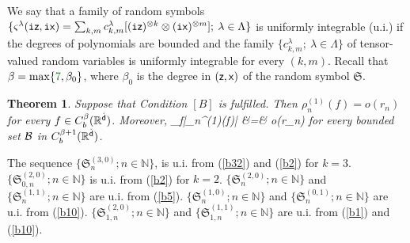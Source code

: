 \documentclass[a4paper]{article}
\newcommand{\colorg}{\color[rgb]{0,0.5,0}}
\newcommand{\colorg}{\color{black}}%
\numberwithin{equation}{section}
\newtheorem{thm}[prop]{Theorem}
\def\tti{{\tt i}}
\newcommand{\sfx}{{\sf x}}
\newcommand{\sfz}{{\sf z}}
\def\sfd{{\sf d}}
\begin{document}
{We say that a family of random symbols 
$\{\varsigma^\lambda(\tti\sfz,\tti\sfx)=\sum_{k,m} c_{k,m}^\lambda[(\tti\sfz)^{\otimes k}\otimes(\tti\sfx)^{\otimes m}];\>\lambda\in\Lambda\}$ is uniformly integrable (u.i.)
if the degrees of polynomials are bounded %
and the family $\{c_{k,m}^\lambda;\>\lambda\in\Lambda\}$ of 
tensor-valued random variables 
is uniformly integrable for every $(k,m)$. 
Recall that $\beta=\max\{{\colorg 7},\beta_0\}$, where $\beta_0$ is the degree in $(\sfz,\sfx)$ of 
the random symbol ${\mathfrak S}$.



\begin{thm}    \label{thm2}
Suppose that Condition $[B]$ is fulfilled. Then 
$\rho_n^{(1)}(f) = o(r_n)$ for every $f\in C^\beta_b(\bbR^{\check{\sfd}})$. 
Moreover, 
\beas 
\sup_{f\in \calb}|\rho_n^{(1)}(f)| &=& o(r_n)
\eeas
for every bounded set ${\mathcal B}$ in $C^{\beta+1}_b(\bbR^{\check{\sfd}})$. 
\end{thm}


\proof
%
The sequence $\{{\mathfrak S}^{(3,0)}_n; n\in \mathbb{N}\}$,  is u.i. from (\ref{b32}) %
and (\ref{b2}) for $k=3$. 
$\{{\mathfrak S}^{(2,0)}_{0,n};  n\in \mathbb{N}\}$ is u.i. from (\ref{b2}) for $k=2$. 
$\{{\mathfrak S}^{(2,0)}_n ; n\in \mathbb{N}\}$ and $\{{\mathfrak S}^{(1,1)}_n; n\in \mathbb{N}\}$ are u.i. from (\ref{b5}). 
$\{{\mathfrak S}^{(1,0)}_n; n\in \mathbb{N}\}$ and $\{{\mathfrak S}^{(0,1)}_n; n\in \mathbb{N}\}$ are u.i. from (\ref{b10}). 
{\colorg 
$\{{\mathfrak S}^{(2,0)}_{1,n}; n\in \mathbb{N}\}$ and $\{{\mathfrak S}^{(1,1)}_{1,n}; n\in \mathbb{N}\}$ are u.i. from (\ref{b1}) and (\ref{b10}).} 

}
\end{document}
